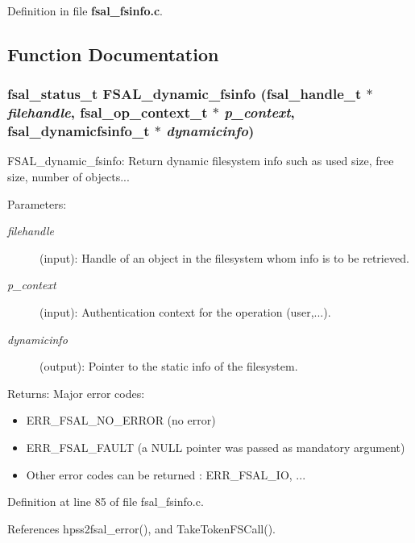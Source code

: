 Definition in file {\bf fsal\_\-fsinfo.c}.

\subsection{Function Documentation}
\subsubsection[{FSAL\_\-dynamic\_\-fsinfo}]{\setlength{\rightskip}{0pt plus 5cm}fsal\_\-status\_\-t FSAL\_\-dynamic\_\-fsinfo (fsal\_\-handle\_\-t $\ast$ {\em filehandle}, \/  fsal\_\-op\_\-context\_\-t $\ast$ {\em p\_\-context}, \/  fsal\_\-dynamicfsinfo\_\-t $\ast$ {\em dynamicinfo})}\label{fsal__fsinfo_8c_7281b3293ac86d7d726796ce15268c1b}


FSAL\_\-dynamic\_\-fsinfo: Return dynamic filesystem info such as used size, free size, number of objects...

\begin{Desc}
\item[Parameters:]
\begin{description}
\item[{\em filehandle}](input): Handle of an object in the filesystem whom info is to be retrieved. \item[{\em p\_\-context}](input): Authentication context for the operation (user,...). \item[{\em dynamicinfo}](output): Pointer to the static info of the filesystem.\end{description}
\end{Desc}
\begin{Desc}
\item[Returns:]Major error codes:\begin{itemize}
\item ERR\_\-FSAL\_\-NO\_\-ERROR (no error)\item ERR\_\-FSAL\_\-FAULT (a NULL pointer was passed as mandatory argument)\item Other error codes can be returned : ERR\_\-FSAL\_\-IO, ... \end{itemize}
\end{Desc}


Definition at line 85 of file fsal\_\-fsinfo.c.

References hpss2fsal\_\-error(), and TakeTokenFSCall().

